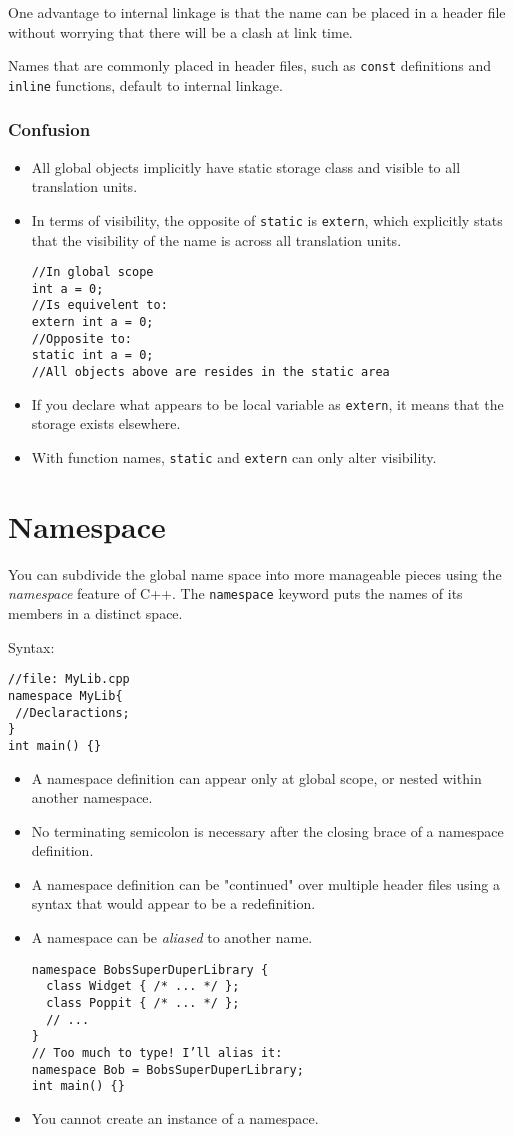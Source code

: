 \documentclass[11pt, a4paper]{book}
\begin{document}
One advantage to internal linkage is that the name can be placed in a header
file without worrying that there will be a clash at link time.

Names that are commonly placed in header files, such as \verb|const| definitions
and \verb|inline| functions, default to internal linkage.

\subsubsection{Confusion}
\begin{itemize}
\item All global objects implicitly have static storage class and visible to all
translation units.
\item In terms of visibility, the opposite of \verb|static| is \verb|extern|,
which explicitly stats that the visibility of the name is across all translation
units.
\begin{verbatim}
//In global scope
int a = 0;
//Is equivelent to:
extern int a = 0;
//Opposite to:
static int a = 0;
//All objects above are resides in the static area 
\end{verbatim}

\item If you declare what appears to be local variable as \verb|extern|, it means that
the storage exists elsewhere.
\item With function names, \verb|static| and \verb|extern| can only alter
visibility.
\end{itemize}
\section{Namespace}
You can subdivide the global name space into more manageable pieces using the \emph{namespace} feature of C++. The \verb|namespace| keyword puts the names of its members in a distinct space. 

Syntax:
\begin{verbatim}
//file: MyLib.cpp
namespace MyLib{
 //Declaractions;
}
int main() {}
\end{verbatim}

\begin{itemize}
\item A namespace definition can appear only at global scope, or nested within another namespace.
\item No terminating semicolon is necessary after the closing brace of a namespace definition.
\item A namespace definition can be "continued" over multiple header files using a syntax that would appear to be a redefinition.
\item A namespace can be \emph{aliased} to another name.
\begin{verbatim}
namespace BobsSuperDuperLibrary {
  class Widget { /* ... */ };
  class Poppit { /* ... */ };
  // ...
}
// Too much to type! I’ll alias it:
namespace Bob = BobsSuperDuperLibrary;
int main() {} 
\end{verbatim}
\item You cannot create an instance of a namespace.
\end{itemize}
\end{document}
